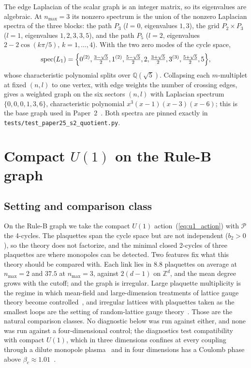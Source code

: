 \documentclass[11pt]{article}
\begin{document}
The edge Laplacian of the scalar graph is an integer matrix, so its
eigenvalues are algebraic.  At $n_{\max}=3$ its nonzero spectrum is the union
of the nonzero Laplacian spectra of the three blocks: the path $P_3$ ($l=0$,
eigenvalues $1,3$), the grid $P_2\times P_3$ ($l=1$, eigenvalues $1,2,3,3,5$),
and the path $P_5$ ($l=2$, eigenvalues $2-2\cos(k\pi/5)$, $k=1,\ldots,4$).
With the two zero modes of the cycle space,
\begin{equation}
\mathrm{spec}(L_1)=\Bigl\{0^{(2)},\tfrac{3-\sqrt5}{2},1^{(2)},\tfrac{5-\sqrt5}{2},
2,\tfrac{3+\sqrt5}{2},3^{(3)},\tfrac{5+\sqrt5}{2},5\Bigr\},
\label{eq:L1_spectrum}
\end{equation}
whose characteristic polynomial splits over $\mathbb{Q}(\sqrt5)$.  Collapsing
each $m$-multiplet at fixed $(n,l)$ to one vertex, with edge weights the
number of crossing edges, gives a weighted graph on the six sectors $(n,l)$
with Laplacian spectrum $\{0,0,0,1,3,6\}$, characteristic polynomial
$x^3(x-1)(x-3)(x-6)$; this is the base graph used in Paper~2~\cite{paper2}.
Both spectra are pinned exactly in \texttt{tests/test\_paper25\_s2\_quotient.py}.

\section{Compact $U(1)$ on the Rule-B graph}
\label{sec:ruleb}

\subsection{Setting and comparison class}

On the Rule-B graph we take the compact $U(1)$ action~(\ref{eq:u1_action})
with $\mathcal{P}$ the 4-cycles.  The plaquettes span the cycle space but are
not independent ($b_2>0$), so the theory does not factorize, and the
minimal closed 2-cycles of three plaquettes are where monopoles can be
detected.  Two features fix what this theory should be compared with.  Each
link lies in $8.8$ plaquettes on average at $n_{\max}=2$ and $37.5$ at
$n_{\max}=3$, against $2(d-1)$ on $\mathbb{Z}^d$, and the mean degree grows
with the cutoff; and the graph is irregular.  Large plaquette multiplicity is
the regime in which mean-field and large-dimension treatments of lattice
gauge theory become controlled~\cite{drouffe_zuber1983}, and irregular
lattices with plaquettes taken as the smallest loops are the setting of
random-lattice gauge theory~\cite{christ_friedberg_lee1982}.  Those are the
natural comparison classes.  No diagnostic below was run against either, and
none was run against a four-dimensional control; the diagnostics test
compatibility with compact $U(1)$, which in three dimensions confines at
every coupling through a dilute monopole plasma~\cite{polyakov1977,banks_myerson_kogut1977}
and in four dimensions has a Coulomb phase above
$\beta_c\approx1.01$~\cite{guth1980,degrand_toussaint1980}.
\end{document}
